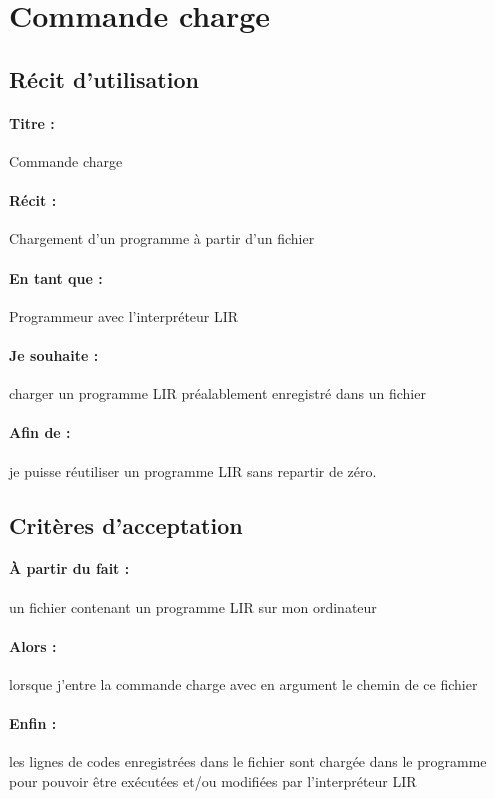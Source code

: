 \section{Commande charge}

\subsection*{Récit d'utilisation}

\paragraph{Titre : } Commande charge
\paragraph{Récit : } Chargement d'un programme à partir d'un fichier
\paragraph{En tant que : } Programmeur avec l'interpréteur LIR
\paragraph{Je souhaite : }  charger un programme LIR préalablement enregistré dans un fichier
\paragraph{Afin de : } je puisse réutiliser un programme LIR sans repartir de zéro.

\subsection*{Critères d'acceptation}

\paragraph{À partir du fait : } un fichier contenant un programme LIR sur mon ordinateur
\paragraph{Alors : } lorsque j'entre la commande charge avec en argument le chemin de ce fichier
\paragraph{Enfin : } les lignes de codes enregistrées dans le fichier sont chargée dans le
                     programme pour pouvoir être exécutées et/ou modifiées par l'interpréteur LIR
